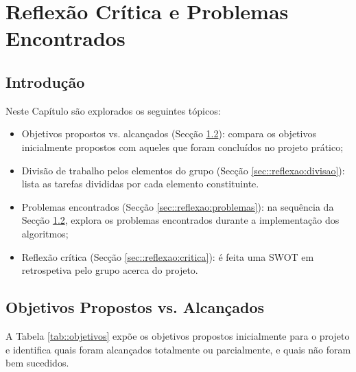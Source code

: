 \chapter{Reflexão Crítica e Problemas Encontrados}
\label{ch::reflexao}

\section{Introdução}
\label{sec::reflexao:intro}

Neste Capítulo são explorados os seguintes tópicos:

\begin{itemize}
	\item Objetivos propostos vs. alcançados (Secção \ref{sec::reflexao:objetivos}): compara os objetivos inicialmente propostos com aqueles que foram concluídos no projeto prático;
	
	\item Divisão de trabalho pelos elementos do grupo (Secção \ref{sec::reflexao:divisao}): lista as tarefas divididas por cada elemento constituinte.
	
	\item Problemas encontrados (Secção \ref{sec::reflexao:problemas}): na sequência da Secção \ref{sec::reflexao:objetivos}, explora os problemas encontrados durante a implementação dos algoritmos;
	
	\item Reflexão crítica (Secção \ref{sec::reflexao:critica}): é feita uma \ac{SWOT} em retrospetiva pelo grupo acerca do projeto.
\end{itemize}


\section{Objetivos Propostos vs. Alcançados}
\label{sec::reflexao:objetivos}

A Tabela \ref{tab::objetivos} expõe os objetivos propostos inicialmente para o projeto e identifica quais foram alcançados totalmente ou parcialmente, e quais não foram bem sucedidos.

